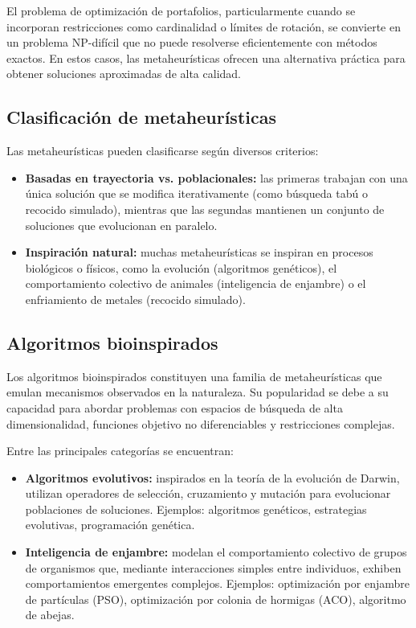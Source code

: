 \documentclass[12pt]{article}
\begin{document}
El problema de optimización de portafolios, particularmente cuando se
incorporan restricciones como cardinalidad o límites de rotación,
se convierte en un problema NP-difícil que no puede resolverse
eficientemente con métodos exactos. En estos casos, las
metaheurísticas ofrecen una alternativa práctica para obtener
soluciones aproximadas de alta calidad.

\subsection{Clasificación de metaheurísticas}

Las metaheurísticas pueden clasificarse según diversos criterios:

\begin{itemize}
  \item \textbf{Basadas en trayectoria vs. poblacionales:} las
    primeras trabajan con una única solución que se modifica
    iterativamente (como búsqueda tabú o recocido simulado),
    mientras que las segundas mantienen un conjunto de soluciones
    que evolucionan en paralelo.

  \item \textbf{Inspiración natural:} muchas metaheurísticas se
    inspiran en procesos biológicos o físicos, como la evolución
    (algoritmos genéticos), el comportamiento colectivo de animales
    (inteligencia de enjambre) o el enfriamiento de metales (recocido
    simulado).
\end{itemize}

\subsection{Algoritmos bioinspirados}

Los algoritmos bioinspirados constituyen una familia de
metaheurísticas que emulan mecanismos observados en la naturaleza.
Su popularidad se debe a su capacidad para abordar problemas con
espacios de búsqueda de alta dimensionalidad, funciones objetivo no
diferenciables y restricciones complejas.

Entre las principales categorías se encuentran:

\begin{itemize}
  \item \textbf{Algoritmos evolutivos:} inspirados en la teoría de la
    evolución de Darwin, utilizan operadores de selección,
    cruzamiento y mutación para evolucionar poblaciones de
    soluciones. Ejemplos: algoritmos genéticos, estrategias
    evolutivas, programación genética.

  \item \textbf{Inteligencia de enjambre:} modelan el comportamiento
    colectivo de grupos de organismos que, mediante interacciones
    simples entre individuos, exhiben comportamientos emergentes
    complejos. Ejemplos: optimización por enjambre de partículas
    (PSO), optimización por colonia de hormigas (ACO), algoritmo de
    abejas.
\end{itemize}
\end{document}
